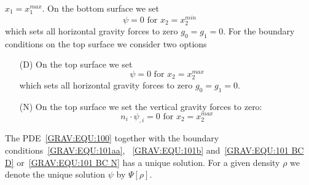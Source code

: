 $x_1=x^{max}_1$. On the bottom surface we set 
\begin{equation}\label{GRAV:EQU:101b}
\psi = 0 \mbox{ for } x_2=x^{min}_2
\end{equation} 
which sets all horizontal gravity forces to zero $g_0=g_1=0$. 
For the boundary conditions on the top surface we consider two options
\begin{itemize}
 \item[(D)] 
On the top surface we set 
\begin{equation}\label{GRAV:EQU:101 BC D}
\psi = 0 \mbox{ for } x_2=x^{max}_2
\end{equation} 
which sets all horizontal gravity forces to zero $g_0=g_1=0$.
 \item[(N)] 
On the top surface we set the vertical gravity forces to zero:
\begin{equation}\label{GRAV:EQU:101 BC N}
n_i \cdot  \psi_{,i} = 0 \mbox{ for } x_2=x^{max}_2
\end{equation} 
\end{itemize}
The PDE~\ref{GRAV:EQU:100} together with the boundary conditions~\ref{GRAV:EQU:101aa}, ~\ref{GRAV:EQU:101b}
and~\ref{GRAV:EQU:101 BC D} or~\ref{GRAV:EQU:101 BC N}
has a unique solution. For a given density $\rho$ we denote the unique solution $\psi$ by $\Psi[\rho]$.


